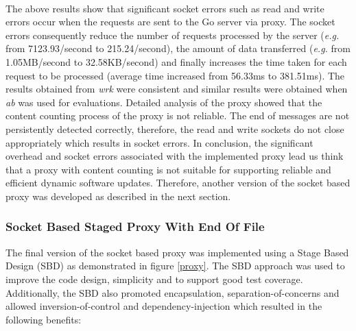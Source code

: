 \documentclass[a4paper,11pt,twoside]{article}
\begin{document}
\noindent \\
The above results show that significant socket errors such as read and write errors occur when the requests are sent to the Go server via proxy. The socket errors consequently reduce the number of requests processed by the server (\textit{e.g.} from 7123.93/second to  215.24/second), the amount of data transferred (\textit{e.g.} from 1.05MB/second to 32.58KB/second) and finally increases the time taken for each request to be processed (average time increased from 56.33ms to 381.51ms). The results obtained from \textit{wrk} were consistent and similar results were obtained when \textit{ab} was used for evaluations. Detailed analysis of the proxy showed that the content counting process of the proxy is not reliable. The end of messages are not persistently detected correctly, therefore, the read and write sockets do not close appropriately which results in socket errors. In conclusion, the significant overhead and socket errors associated with the implemented proxy lead us think that a proxy with content counting  is not suitable for supporting reliable and efficient dynamic software updates. Therefore, another version of the socket based proxy was developed as described in the next section.

\subsubsection{Socket Based Staged Proxy With End Of File}\label{staged}
The final version of the socket based proxy was implemented using a Stage Based Design (SBD) as demonstrated in figure \ref{proxy}. The SBD  approach was used to improve the code design, simplicity and to support good test coverage. Additionally, the SBD also promoted encapsulation, separation-of-concerns and allowed inversion-of-control and dependency-injection which resulted in the following benefits:
\end{document}
